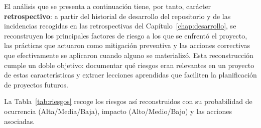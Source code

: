 El análisis que se presenta a continuación tiene, por tanto, carácter
\textbf{retrospectivo}: a partir del historial de desarrollo del
repositorio y de las incidencias recogidas en las retrospectivas del
Capítulo~\ref{chap:desarrollo}, se reconstruyen los
principales factores de riesgo a los que se enfrentó el proyecto, las
prácticas que actuaron como mitigación preventiva y las acciones
correctivas que efectivamente se aplicaron cuando alguno se
materializó.  Esta reconstrucción cumple un doble objetivo: documentar
qué riesgos eran relevantes en un proyecto de estas características y
extraer lecciones aprendidas que faciliten la planificación de
proyectos futuros.

La Tabla~\ref{tab:riesgos} recoge los riesgos así reconstruidos con su
probabilidad de ocurrencia (Alta/Media/Baja), impacto (Alto/Medio/Bajo)
y las acciones asociadas.

